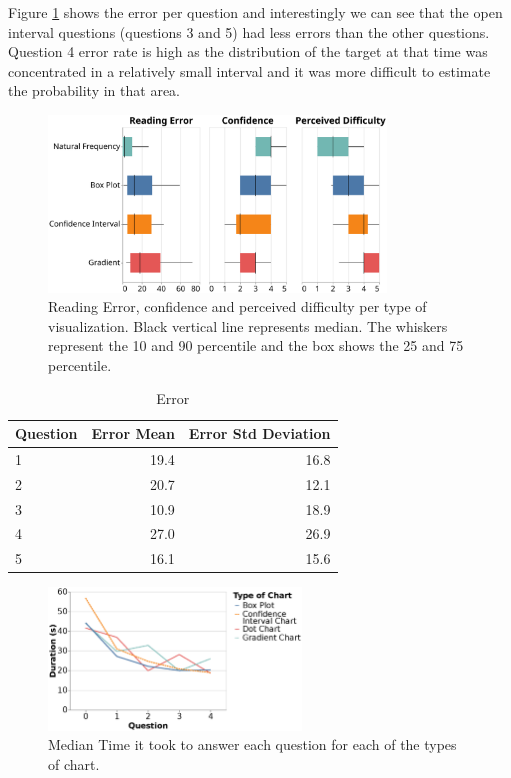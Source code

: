 \documentclass[a4paper,3p,sort&compress]{elsarticle}
\begin{document}
Figure \ref{table:resultsperquestion} shows the error per question and interestingly we can see that the open interval questions (questions 3 and 5) 
had less errors than the other questions. Question 4 error rate is high as the distribution of the target at that time was concentrated in a relatively 
small interval and it was more difficult to estimate the probability in that area. 

\begin{figure}
  \centering
  \includegraphics[width=0.8\textwidth]{comparison}
  \caption{\label{figure:errors}Reading Error, confidence and perceived difficulty per 
  type of visualization. Black vertical line represents median.
  The whiskers represent the 10 and 90 percentile and the box shows the 25 and 
  75 percentile.}
\end{figure}


\begin{table}[h!]
  \centering
  \begin{tabular}{lrr}
    \toprule
    {}Question &     Error Mean &        Error Std Deviation \\
    \midrule
    1 &  19.4 &  16.8 \\
    2 &  20.7 &  12.1 \\
    3 &  10.9 &  18.9 \\
    4 &  27.0 &  26.9 \\
    5 &  16.1 &  15.6 \\
    \bottomrule
    \end{tabular}
  \caption{Error}
  \label{table:resultsperquestion}
  \end{table}

\begin{figure}
  \centering
   \includegraphics[width=0.6\textwidth]{duration_evo2}
  \caption{\label{figure:duration} Median Time it took to answer each question for each of the types of chart.}
\end{figure}  
\end{document}
